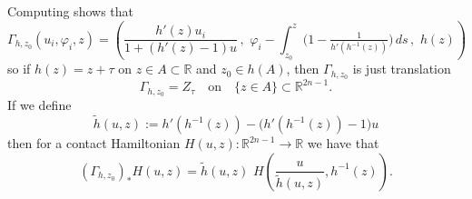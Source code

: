 \documentclass[12pt]{paper}
\theoremstyle{plain}
\theoremstyle{definition}
\newcommand{\eps}{\varepsilon}
\newcommand{\R}{{\mathbb{R}}}
\def\Op{{\mathcal O}{\it p}\,}
\numberwithin{figure}{section}
\begin{document}
Computing shows that 
$$
	\Gamma_{h, z_0}(u_i, \varphi_i, z) = \left(\frac{h'(z)u_i}{1+(h'(z) -1)u}\,,\,\, \varphi_i - \int_{z_0}^z \Big(1 - \tfrac{1}{h'(h^{-1}(z))}\Big)\,ds\,,\,\, h(z)\right)
$$
so if $h(z) = z + \tau$ on $z \in A \subset \R$ and $z_0 \in h(A)$, then $\Gamma_{h, z_0}$ is just translation
\begin{equation}\label{e:GammaZ}
	\Gamma_{h, z_0} = Z_{\tau} \quad\mbox{on}\quad \{z \in A\} \subset \R^{2n-1}.
\end{equation}
If we define
\begin{equation}\label{e:PushTh}
	\tilde{h}(u,z) := h'(h^{-1}(z)) - \big(h'(h^{-1}(z)) - 1\big)u
\end{equation}
then for a contact Hamiltonian $H(u,z): \R^{2n-1} \to \R$ we have that
\begin{equation}\label{e:PushH}
	(\Gamma_{h,z_0})_*H(u,z) = \tilde{h}(u,z)\,\, H\!\left(\frac{u}{\tilde{h}(u,z)}, h^{-1}(z)\right).
\end{equation}






%
%
	
\end{document}

